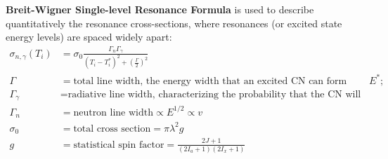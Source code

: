 \documentclass{school-22.101-notes}
\begin{document}
\begin{enumerate}
  \textbf{Breit-Wigner Single-level Resonance Formula} is used to describe quantitatively the resonance cross-sections, where resonances (or excited state energy levels) are spaced widely apart: 
  \begin{align}
    \sigma_{n, \gamma} (T_i) &= \sigma_0 \frac{\Gamma_n \Gamma_{\gamma}}{(T_i - T_i^*)^2 + \left( \frac{\Gamma}{2} \right)^2} \\
    \Gamma &= \mbox{total line width, the energy width that an excited CN can form about $E^*$;} \\
    \Gamma_{\gamma} &= \mbox{radiative line width, characterizing the probability that the CN will decay with gamma emission;} \\
    \Gamma_n &= \mbox{neutron line width} \propto E^{1/2} \propto v \\
    \sigma_0 &= \mbox{total cross section} = \pi \lambda^2 g \\
    g &= \mbox{statistical spin factor} = \frac{2J + 1}{(2 I_a + 1) (2 I_x + 1)}
  \end{align}
\end{enumerate}
\end{document}
